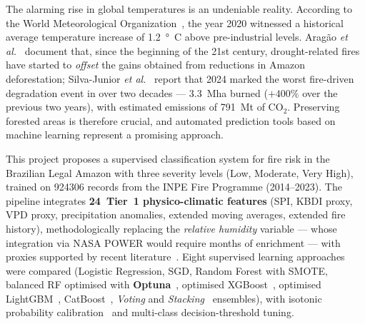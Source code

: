   \begin{foreignabstract}
The alarming rise in global temperatures is an undeniable reality. According to the World Meteorological Organization~\cite{wmo2021}, the year 2020 witnessed a historical average temperature increase of \SI{1.2}{\degree C} above pre-industrial levels. Aragão \emph{et al.}~\cite{aragao2018amazon} document that, since the beginning of the 21st century, drought-related fires have started to \emph{offset} the gains obtained from reductions in Amazon deforestation; Silva-Junior \emph{et al.}~\cite{silvajunior2025amazon} report that 2024 marked the worst fire-driven degradation event in over two decades --- \SI{3.3}{\mega\hectare} burned (\(+400\%\) over the previous two years), with estimated emissions of \SI{791}{\mega\tonne} of CO$_{2}$. Preserving forested areas is therefore crucial, and automated prediction tools based on machine learning represent a promising approach.

This project proposes a supervised classification system for fire risk in the Brazilian Legal Amazon with three severity levels (Low, Moderate, Very High), trained on \num{924306} records from the INPE Fire Programme (2014--2023). The pipeline integrates \textbf{24~Tier~1 physico-climatic features} (SPI, KBDI proxy, VPD proxy, precipitation anomalies, extended moving averages, extended fire history), methodologically replacing the \emph{relative humidity} variable --- whose integration via NASA POWER would require months of enrichment --- with proxies supported by recent literature~\cite{seager2015climatology,forests2024cerradoamazon,npjhazards2025fire}. Eight supervised learning approaches were compared (Logistic Regression, SGD, Random Forest with SMOTE, balanced RF optimised with \textbf{Optuna}~\cite{akiba2019optuna}, optimised XGBoost~\cite{chen2016xgboost}, optimised LightGBM~\cite{ke2017lightgbm}, CatBoost~\cite{prokhorenkova2018catboost}, \emph{Voting} and \emph{Stacking}~\cite{wolpert1992stacked} ensembles), with isotonic probability calibration~\cite{zadrozny2002transforming} and multi-class decision-threshold tuning.


\end{foreignabstract}
